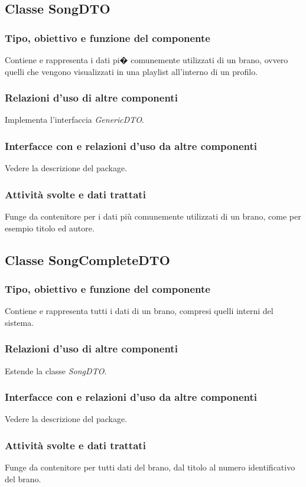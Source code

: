 \subsection{Classe SongDTO}
\subsubsection*{Tipo, obiettivo e funzione del componente}
Contiene e rappresenta i dati pi� comunemente utilizzati di un brano, ovvero
quelli che vengono visualizzati in una playlist all'interno di un profilo.
\subsubsection*{Relazioni d'uso di altre componenti}
Implementa l'interfaccia \textit{GenericDTO}.
\subsubsection*{Interfacce con e relazioni d'uso da altre componenti}
Vedere la descrizione del package.
\subsubsection*{Attivit\`a svolte e dati trattati}
Funge da contenitore per i dati pi\`u comunemente utilizzati di un brano, come
per esempio titolo ed autore.

\subsection{Classe SongCompleteDTO}
\subsubsection*{Tipo, obiettivo e funzione del componente}
Contiene e rappresenta tutti i dati di un brano, compresi quelli interni del
sistema. 
\subsubsection*{Relazioni d'uso di altre componenti}
Estende la classe \textit{SongDTO}.
\subsubsection*{Interfacce con e relazioni d'uso da altre componenti}
Vedere la descrizione del package.
\subsubsection*{Attivit\`a svolte e dati trattati}
Funge da contenitore per tutti dati del brano, dal titolo al numero
identificativo del brano. 

